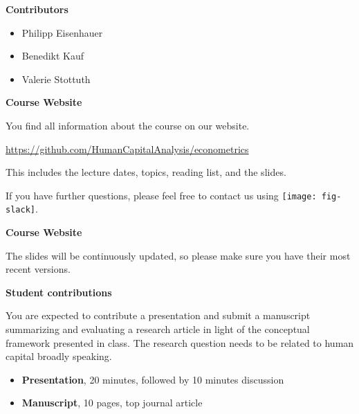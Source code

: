 \begin{frame}\textbf{Contributors}\vspace{0.3cm}

\begin{itemize}\setlength\itemsep{1em}
\item Philipp Eisenhauer
\item Benedikt Kauf
\item Valerie Stottuth
\end{itemize}

\end{frame}
\begin{frame}
	\textbf{Course Website}\vspace{0.3cm}

You find all information about the course on our website.

\begin{center}
\url{https://github.com/HumanCapitalAnalysis/econometrics}
\end{center}

This includes the lecture dates, topics, reading list, and the slides.\vspace{0.3cm}

If you have further questions, please feel free to contact us using
\texttt{[image: fig-slack]}.

\end{frame}
\begin{frame}
	\textbf{Course Website}\vspace{0.3cm}

The slides will be continuously updated, so please make sure you have their most recent versions.

\end{frame}
\begin{frame}
	\textbf{Student contributions}\vspace{0.3cm}

You are expected to contribute a presentation and submit a manuscript summarizing and evaluating a research article in light of the conceptual framework presented in class. The research question needs to be related to human capital broadly speaking.

\begin{itemize}
\item \textbf{Presentation}, 20 minutes, followed by 10 minutes discussion
\item \textbf{Manuscript}, 10 pages, top journal article
\end{itemize}

\end{frame}
